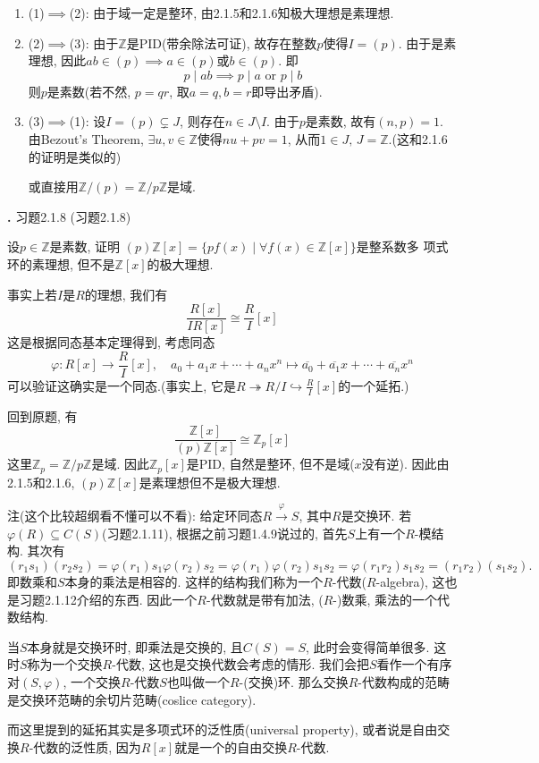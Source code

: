 \documentclass[UTF8,fontset=windows]{ctexart}
\newcounter{problem}
\newenvironment{problem}[1][]
{
    \refstepcounter{problem}
    \noindent\textbf{\theproblem.}
    \ifx\relax#1\relax
    \else
        (#1)
    \fi
    \par\vspace{0.5em}
}
{\vspace{1em}}
\newenvironment{solution}
{\begin{tcolorbox}[colback=blue!10, colframe=blue!50, title=\textit{proof}, breakable]}
{\end{tcolorbox}}
\begin{document}
\begin{solution}
    \begin{enumerate}[1.]
        \item (1)$\implies$(2): 由于域一定是整环, 由2.1.5和2.1.6知极大理想是素理想.
        \item (2)$\implies$(3): 由于$\mathbb{Z}$是PID(带余除法可证), 故存在整数$p$使得$I = (p)$. 由于是素理想, 因此$ab \in (p) \implies a \in (p)$或$b \in (p)$. 即
        \[
            p \mid ab \implies p \mid a \text{ or } p \mid b
        \]
        则$p$是素数(若不然, $p = qr$, 取$a = q, b = r$即导出矛盾).
        \item (3)$\implies$(1): 设$I = (p) \subsetneq J$, 则存在$n \in J \setminus I$. 由于$p$是素数, 故有$(n, p) = 1$. 由Bezout's Theorem, $\exists u, v \in \mathbb{Z}$使得$nu + pv = 1$, 从而$1 \in J,\, J = \mathbb{Z}$.(这和2.1.6的证明是类似的)
        
        或直接用$\mathbb{Z}/(p) = \mathbb{Z}/p\mathbb{Z}$是域.
    \end{enumerate}
\end{solution}

\begin{problem}[习题2.1.8]
    设$p \in \mathbb{Z}$是素数, 证明
$(p)\mathbb{Z}[x] = \{pf(x) \mid \forall f(x) \in \mathbb{Z}[x]\}$是整系数多
项式环的素理想, 但不是$\mathbb{Z}[x]$的极大理想.
\end{problem}

\begin{solution}
    事实上若$I$是$R$的理想, 我们有
\[
    \frac{R[x]}{IR[x]} \cong \frac{R}{I}[x]
\]
这是根据同态基本定理得到, 考虑同态
\[
    \varphi: R[x] \to \frac{R}{I}[x],\quad a_0 + a_1x + \cdots + a_nx^n \mapsto \overline{a_0} + \overline{a_1}x + \cdots + \overline{a_n}x^n
\]
可以验证这确实是一个同态.(事实上, 它是$R \twoheadrightarrow R/I \hookrightarrow \frac{R}{I}[x]$的一个延拓.)

回到原题, 有
\[
    \frac{\mathbb{Z}[x]}{(p)\mathbb{Z}[x]} \cong \mathbb{Z}_p[x]
\]
这里$\mathbb{Z}_p = \mathbb{Z}/p\mathbb{Z}$是域. 因此$\mathbb{Z}_p[x]$是PID, 自然是整环, 但不是域($x$没有逆). 因此由2.1.5和2.1.6, $(p)\mathbb{Z}[x]$是素理想但不是极大理想.

注(这个比较超纲看不懂可以不看): 给定环同态$R \overset{\varphi}\to S$, 其中$R$是交换环. 若$\varphi(R) \subseteq C(S)$(习题2.1.11), 根据之前习题1.4.9说过的, 首先$S$上有一个$R$-模结构. 其次有
\[
    (r_1s_1)(r_2s_2) = \varphi(r_1)s_1\varphi(r_2)s_2 = \varphi(r_1)\varphi(r_2)s_1s_2 = \varphi(r_1r_2)s_1s_2 = (r_1r_2)(s_1s_2).
\]
即数乘和$S$本身的乘法是相容的. 这样的结构我们称为一个$R$-代数($R$-algebra), 这也是习题2.1.12介绍的东西. 因此一个$R$-代数就是带有加法, ($R$-)数乘, 乘法的一个代数结构.

当$S$本身就是交换环时, 即乘法是交换的, 且$C(S) = S$, 此时会变得简单很多. 这时$S$称为一个交换$R$-代数, 这也是交换代数会考虑的情形. 我们会把$S$看作一个有序对$(S, \varphi)$, 一个交换$R$-代数$S$也叫做一个$R$-(交换)环. 那么交换$R$-代数构成的范畴是交换环范畴的余切片范畴(coslice category).

而这里提到的延拓其实是多项式环的泛性质(universal property), 或者说是自由交换$R$-代数的泛性质, 因为$R[x]$就是一个的自由交换$R$-代数.
\end{solution}
\end{document}
